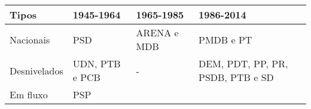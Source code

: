 \documentclass[]{article}
\begin{document}
\begin{longtable}[]{@{}llll@{}}
\toprule
\begin{minipage}[b]{0.09\columnwidth}\raggedright\strut
\textbf{Tipos}\strut
\end{minipage} & \begin{minipage}[b]{0.15\columnwidth}\raggedright\strut
\textbf{1945-1964}\strut
\end{minipage} & \begin{minipage}[b]{0.15\columnwidth}\raggedright\strut
\textbf{1965-1985}\strut
\end{minipage} & \begin{minipage}[b]{0.14\columnwidth}\raggedright\strut
\textbf{1986-2014}\strut
\end{minipage}\tabularnewline
\midrule
\endhead
\begin{minipage}[t]{0.09\columnwidth}\raggedright\strut
Nacionais\strut
\end{minipage} & \begin{minipage}[t]{0.15\columnwidth}\raggedright\strut
PSD\strut
\end{minipage} & \begin{minipage}[t]{0.15\columnwidth}\raggedright\strut
ARENA e MDB\strut
\end{minipage} & \begin{minipage}[t]{0.14\columnwidth}\raggedright\strut
PMDB e PT\strut
\end{minipage}\tabularnewline
\begin{minipage}[t]{0.09\columnwidth}\raggedright\strut
Desnivelados\strut
\end{minipage} & \begin{minipage}[t]{0.15\columnwidth}\raggedright\strut
UDN, PTB e PCB\strut
\end{minipage} & \begin{minipage}[t]{0.15\columnwidth}\raggedright\strut
-\strut
\end{minipage} & \begin{minipage}[t]{0.14\columnwidth}\raggedright\strut
DEM, PDT, PP, PR, PSDB, PTB e SD\strut
\end{minipage}\tabularnewline
\begin{minipage}[t]{0.09\columnwidth}\raggedright\strut
Em fluxo\strut
\end{minipage} & \begin{minipage}[t]{0.15\columnwidth}\raggedright\strut
PSP\strut
\end{minipage} & \begin{minipage}[t]{0.15\columnwidth}\raggedright\strut

\end{minipage}
\end{longtable}
\end{document}
